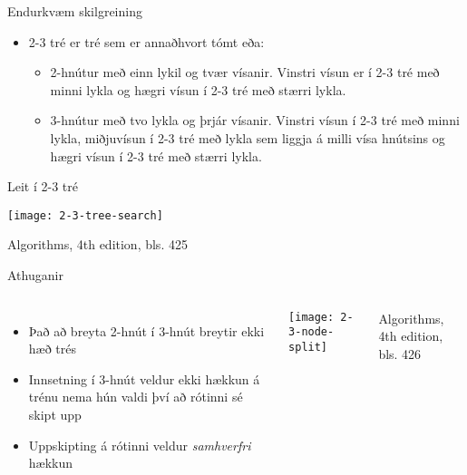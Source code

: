 \documentclass{beamer}
\begin{document}
\begin{frame}{Endurkvæm skilgreining}
	\begin{itemize}
		\item 2-3 tré er tré sem er annaðhvort tómt eða:
		      \begin{itemize}
			      \item 2-hnútur með einn lykil og tvær vísanir. Vinstri vísun er í 2-3 tré með minni lykla og hægri vísun í 2-3 tré með stærri lykla.
			      \item 3-hnútur með tvo lykla og þrjár vísanir. Vinstri vísun í 2-3 tré með minni lykla, miðjuvísun í 2-3 tré með lykla sem liggja á milli vísa hnútsins og hægri vísun í 2-3 tré með stærri lykla.
		      \end{itemize}
	\end{itemize}
\end{frame}

\begin{frame}{Leit í 2-3 tré}
	\begin{center}
		\texttt{[image: 2-3-tree-search]}

		Algorithms, 4th edition, bls. 425
	\end{center}
\end{frame}



\begin{frame}{Athuganir}
	\begin{columns}
		\begin{itemize}
			\item Það að breyta 2-hnút í 3-hnút breytir ekki hæð trés
			\item Innsetning í 3-hnút veldur ekki hækkun á trénu nema hún valdi því að rótinni sé skipt upp
			\item Uppskipting á rótinni veldur \emph{samhverfri} hækkun
		\end{itemize}
		\texttt{[image: 2-3-node-split]}

		Algorithms, 4th edition, bls. 426
	\end{columns}
\end{frame}



\end{document}
